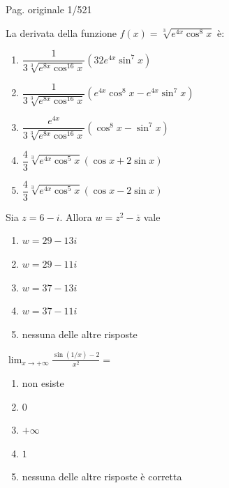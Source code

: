 
\par\noindent\hfill{\color{cyan!65!black}\scriptsize Pag. originale 1/521}\par\smallskip
\begin{quiz}
La derivata della funzione $f(x)=\sqrt[3]{e^{4x}\cos^{8}x}$ \`e:
\begin{enumerate}[label=\alph*),leftmargin=1.3cm,itemsep=3pt,topsep=5pt]
\item $\dfrac{1}{3\sqrt[3]{e^{8x}\cos^{16}x}}(32e^{4x}\sin^{7}x)$
\item $\dfrac{1}{3\sqrt[3]{e^{8x}\cos^{16}x}}(e^{4x}\cos^{8}x-e^{4x}\sin^{7}x)$
\item $\dfrac{e^{4x}}{3\sqrt[3]{e^{8x}\cos^{16}x}}(\cos^{8}x-\sin^{7}x)$
\item $\dfrac43\sqrt[3]{e^{4x}\cos^{5}x}(\cos x+2\sin x)$
\item $\dfrac43\sqrt[3]{e^{4x}\cos^{5}x}(\cos x-2\sin x)$
\end{enumerate}
\end{quiz}

\begin{quiz}
Sia $z=6-i$. Allora $w=z^2-\overline z$ vale
\begin{enumerate}[label=\alph*),leftmargin=1.3cm,itemsep=3pt,topsep=5pt]\item $w=29-13i$\item $w=29-11i$\item $w=37-13i$\item $w=37-11i$\item nessuna delle altre risposte\end{enumerate}
\end{quiz}

\begin{quiz}
$\displaystyle\lim_{x\to+\infty}\frac{\sin(1/x)-2}{x^2}=$
\begin{enumerate}[label=\alph*),leftmargin=1.3cm,itemsep=3pt,topsep=5pt]\item non esiste\item $0$\item $+\infty$\item $1$\item nessuna delle altre risposte \`e corretta\end{enumerate}
\end{quiz}

